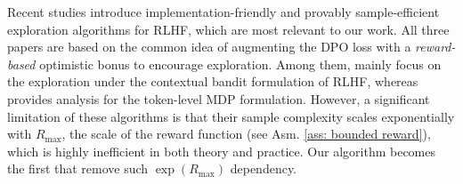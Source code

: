 Recent studies \cite{cen2024value,xie2024exploratory,zhang2024self} introduce implementation-friendly and provably sample-efficient exploration algorithms for RLHF, which are most relevant to our work.
All three papers are based on the common idea of augmenting the DPO loss with a \textit{reward-based} optimistic bonus to encourage exploration. 
Among them, \cite{zhang2024self, cen2024value} mainly focus on the exploration under the contextual bandit formulation of RLHF, whereas \cite{xie2024exploratory} provides analysis for the token-level MDP formulation.
However, a significant limitation of these algorithms is that their sample complexity scales exponentially with $ R_{\text{max}}$, the scale of the reward function (see Asm. \ref{ass: bounded reward}), which is highly inefficient in both theory and practice. Our algorithm becomes the first that remove such $\exp(R_{\text{max}})$ dependency.